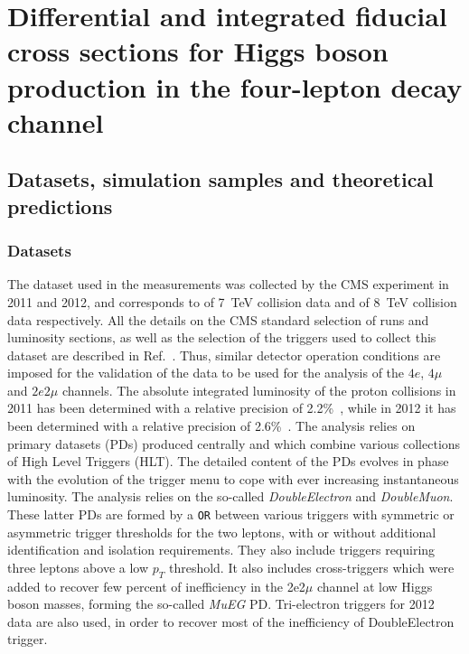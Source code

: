 \chapter{Differential and integrated fiducial cross sections for Higgs boson production in the four-lepton decay channel}\label{Chapter4}

\section{Datasets, simulation samples and theoretical predictions}\label{sec:DatasetsSimulation}
\subsection{Datasets}\label{sec:Datasets}
The dataset used in the measurements was collected by the CMS experiment in 2011 and 2012, and corresponds to \usedLumiA of 7~TeV collision data
and \usedLumiB of 8~TeV collision data respectively. All the details on the CMS standard selection of runs and luminosity sections, as well as the
selection of the triggers used to collect this dataset are described in Ref.~\cite{Chatrchyan:2013mxa}. Thus, similar detector operation conditions are 
imposed for the validation of the data to be used for the analysis of the $4e$, $4\mu$ and $2e2\mu$ channels. The absolute integrated luminosity of the
proton collisions in 2011 has been determined with a relative precision of 2.2\%~\cite{CMS:2011vpa}, while in 2012 it has been determined with a relative
precision of 2.6\%~\cite{CMS-PAS-LUM-13-001}. The analysis relies on primary datasets (PDs) produced centrally and which combine various collections of 
High Level Triggers (HLT).  The detailed content of the PDs evolves in phase with the evolution of the trigger menu to cope with ever increasing
instantaneous luminosity. The analysis relies on the so-called {\it DoubleElectron} and {\it DoubleMuon}. These latter PDs are formed by a {\tt OR} between
various triggers with symmetric or asymmetric trigger thresholds for the two leptons, with or without additional identification and isolation 
requirements. They also include triggers requiring three leptons above a low $p_T$ threshold.  It also includes cross-triggers which were added to
recover few percent of inefficiency in the 2e2$\mu$ channel at low Higgs boson masses, forming the so-called {\it MuEG} PD.  Tri-electron triggers for 2012
data are also used, in order to recover most of the inefficiency of DoubleElectron trigger.
